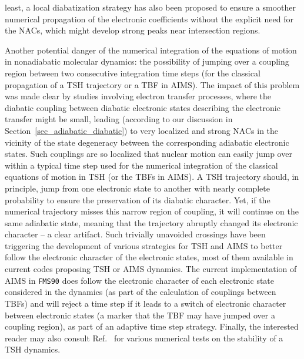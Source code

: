 \documentclass[9pt,bestpractices,pubversion]{livecoms}
\begin{document}
least, a local diabatization strategy has also been proposed to ensure a smoother numerical propagation of the electronic coefficients without the explicit need for the NACs, which might develop strong peaks near intersection regions.\cite{plasser2012} 

Another potential danger of the numerical integration of the equations of motion in nonadiabatic molecular dynamics: the possibility of jumping over a coupling region between two consecutive integration time steps (for the classical propagation of a TSH trajectory or a TBF in AIMS). The impact of this problem was made clear by studies involving electron transfer processes,\cite{fernandezalberti2012tuc} where the diabatic coupling between diabatic electronic states describing the electronic transfer might be small, leading (according to our discussion in Section~\ref{sec_adiabatic_diabatic}) to very localized and strong NACs in the vicinity of the state degeneracy between the corresponding adiabatic electronic states. Such couplings are so localized that nuclear motion can easily jump over within a typical time step used for the numerical integration of the classical equations of motion in TSH (or the TBFs in AIMS). A TSH trajectory should, in principle, jump from one electronic state to another with nearly complete probability to ensure the preservation of its diabatic character. Yet, if the numerical trajectory misses this narrow region of coupling, it will continue on the same adiabatic state, meaning that the trajectory abruptly changed its electronic character -- a clear artifact.\cite{fernandezalberti2012tuc,NELSON2013208,MEEK2015117} Such trivially unavoided crossings have been triggering the development of various strategies for TSH and AIMS to better follow the electronic character of the electronic states,\cite{NELSON2013208,meek2014tdc,MEEK2015117,Lee2019,temen2021tuc,qiu2023practical} most of them available in current codes proposing TSH or AIMS dynamics. The current implementation of AIMS in \texttt{FMS90} does follow the electronic character of each electronic state considered in the dynamics (as part of the calculation of couplings between TBFs) and will reject a time step if it leads to a switch of electronic character between electronic states (a marker that the TBF may have jumped over a coupling region), as part of an adaptive time step strategy.\cite{levine2008implementation} Finally, the interested reader may also consult Ref.~ for various numerical tests on the stability of a TSH dynamics. 
\end{document}
